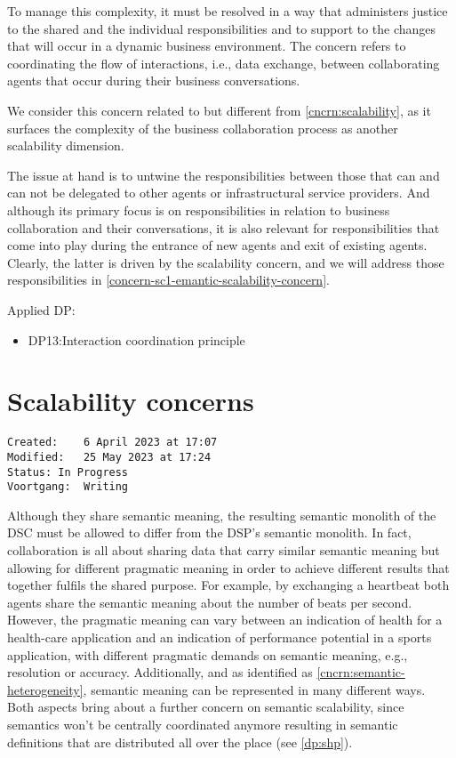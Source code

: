 \documentclass[sort&compress,preprint,3p,authoryear,twocolumn]{elsarticle}
\providecommand{\tightlist}{%
  \setlength{\itemsep}{0pt}\setlength{\parskip}{0pt}}
\theoremstyle{break}			%
\begin{document}
\begin{mmconcern}\label{cncrn:icc}
To manage this complexity, it must be resolved in a way that administers justice to the shared and the individual responsibilities and to support to the changes that will occur in a dynamic business environment. The concern refers to coordinating the flow of interactions, i.e., data exchange, between collaborating agents that occur during their business conversations. 
\end{mmconcern}

We consider this concern related to but different from
\cref{cncrn:scalability}, as it surfaces the complexity of the business
collaboration process as another scalability dimension.

The issue at hand is to untwine the responsibilities between those that
can and can not be delegated to other agents or infrastructural service
providers. And although its primary focus is on responsibilities in
relation to business collaboration and their conversations, it is also
relevant for responsibilities that come into play during the entrance of
new agents and exit of existing agents. Clearly, the latter is driven by
the scalability concern, and we will address those responsibilities in
\cref{concern-sc1-emantic-scalability-concern}.

Applied DP:

\begin{itemize}
\tightlist
\item
  DP13:Interaction coordination principle
\end{itemize}

\section{Scalability concerns}\label{scalability-concerns}

\begin{verbatim}
Created:    6 April 2023 at 17:07
Modified:   25 May 2023 at 17:24
Status: In Progress
Voortgang:  Writing
\end{verbatim}

Although they share semantic meaning, the resulting semantic monolith of
the DSC must be allowed to differ from the DSP's semantic monolith. In
fact, collaboration is all about sharing data that carry similar
semantic meaning but allowing for different pragmatic meaning in order
to achieve different results that together fulfils the shared purpose.
For example, by exchanging a heartbeat both agents share the semantic
meaning about the number of beats per second. However, the pragmatic
meaning can vary between an indication of health for a health-care
application and an indication of performance potential in a sports
application, with different pragmatic demands on semantic meaning, e.g.,
resolution or accuracy. Additionally, and as identified as
\cref{cncrn:semantic-heterogeneity}, semantic meaning can be represented
in many different ways. Both aspects bring about a further concern on
semantic scalability, since semantics won't be centrally coordinated
anymore resulting in semantic definitions that are distributed all over
the place (see \cref{dp:shp}).
\end{document}
